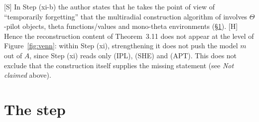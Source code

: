 \documentclass[11pt]{article}
\theoremstyle{plain}
\theoremstyle{definition}
\theoremstyle{remark}
\newcommand{\Smark}{\textup{[S]}}
\newcommand{\Hmark}{\textup{[H]}}
\begin{document}
\Smark{} In Step (xi-b) the author states that he takes the point of view of ``temporarily
forgetting'' that the multiradial construction algorithm of \cite[Thm.~3.11]{IUT3}
involves $\Theta$-pilot objects, theta functions/values and mono-theta environments
(\S\ref{s:step}). \Hmark{} Hence the reconstruction content of Theorem~3.11 does not appear
at the level of Figure~\ref{fig:venn}: within Step (xi), strengthening it does not push the
model $m$ out of $A$, since Step (xi) reads only (IPL), (SHE) and (APT). This does not
exclude that the construction itself supplies the missing statement (see \emph{Not claimed}
above).

\section{The step}\label{s:step}
\end{document}

